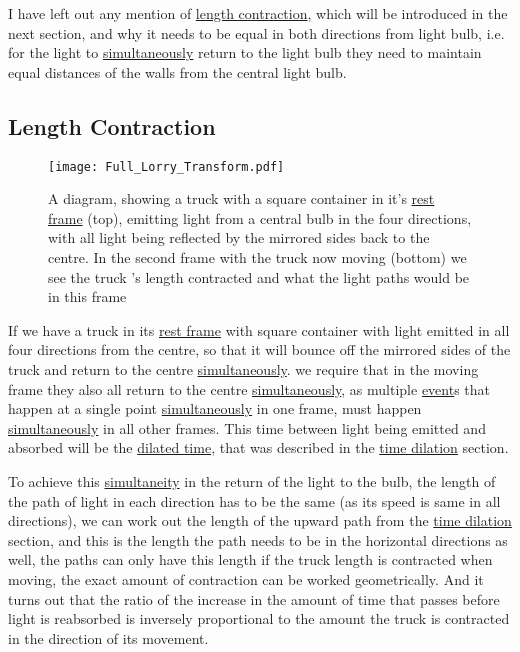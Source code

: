 I have left out any mention of \hyperlink{def-length-contraction}{length contraction}, which will be introduced in the next section, and why it needs to be equal in both directions from light bulb, i.e. for the light to \hyperlink{def-simultaneity}{simultaneously} return to the light bulb they need to maintain equal distances of the walls from the central light bulb.


\subsection{Length Contraction}

\begin{figure}[H]
\centering
       \texttt{[image: Full\_Lorry\_Transform.pdf]}
    \caption{A diagram, showing a truck with a square container in it's \protect\hyperlink{def-proper-frame}{rest frame} (top), emitting light from a central bulb in the four directions, with all light being reflected by the mirrored sides back to the centre. In the second frame with the truck now moving (bottom) we see the truck 's length contracted and what the light paths would be in this frame}
    \label{fig: full truck transform}
\end{figure}


If we have a truck in its \hyperlink{def-proper-frame}{rest frame} with square container with light emitted in all four directions from the centre, so that it will bounce off the mirrored sides of the truck and return to the centre \hyperlink{def-simultaneity}{simultaneously}. we require that in the moving frame they also all return to the centre \hyperlink{def-simultaneity}{simultaneously}, as multiple \hyperlink{def-event}{event}s that happen at a single point \hyperlink{def-simultaneity}{simultaneously} in one frame, must happen \hyperlink{def-simultaneity}{simultaneously} in all other frames. This time between light being emitted and absorbed will be the \hyperlink{def-time-dilation}{dilated time}, that was described in the \hyperlink{def-time-dilation}{time dilation} section. 

To achieve this \hyperlink{def-simultaneity}{simultaneity} in the return of the light to the bulb, the length of the path of light in each direction has to be the same (as its speed is same in all directions), we can work out the length of the upward path from the \hyperlink{def-time-dilation}{time dilation} section, and this is the length the path needs to be in the horizontal directions as well, the paths can only have this length if the truck length is contracted when moving, the exact amount of contraction can be worked geometrically. And it turns out that the ratio of the increase in the amount of time that passes before light is reabsorbed is inversely proportional to the amount the truck is contracted in the direction of its movement.

